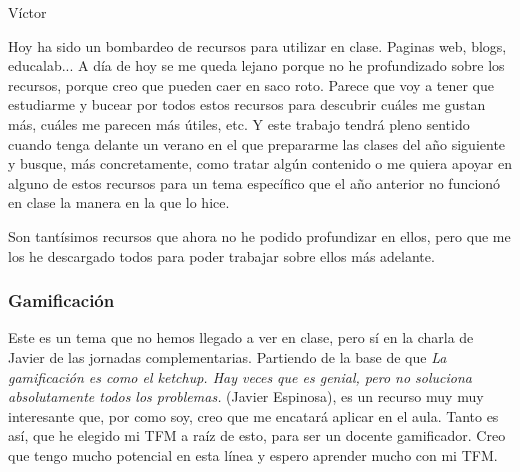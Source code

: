 \begin{opin}{\victorcolor}{Víctor}

Hoy ha sido un bombardeo de recursos para utilizar en clase. Paginas web, blogs, educalab... 
%
A día de hoy se me queda lejano porque no he profundizado sobre los recursos, porque creo que pueden caer en saco roto.
%
Parece que voy a tener que estudiarme y bucear por todos estos recursos para descubrir cuáles me gustan más, cuáles me parecen más útiles, etc.
%
Y este trabajo tendrá pleno sentido cuando tenga delante un verano en el que prepararme las clases del año siguiente y busque, más concretamente, como tratar algún contenido o me quiera apoyar en alguno de estos recursos para un tema específico que el año anterior no funcionó en clase la manera en la que lo hice.

Son tantísimos recursos que ahora no he podido profundizar en ellos, pero que me los he descargado todos para poder trabajar sobre ellos más adelante.

\subsubsection{Gamificación}

Este es un tema que no hemos llegado a ver en clase, pero sí en la charla de Javier de las jornadas complementarias.
%
Partiendo de la base de que \textit{La gamificación es como el ketchup. Hay veces que es genial, pero no soluciona absolutamente todos los problemas.} (Javier Espinosa), es un recurso muy muy interesante que, por como soy, creo que me encatará aplicar en el aula.
%
Tanto es así, que he elegido mi TFM a raíz de esto, para ser un docente gamificador. 
%
Creo que tengo mucho potencial en esta línea y espero aprender mucho con mi TFM.

\end{opin}


